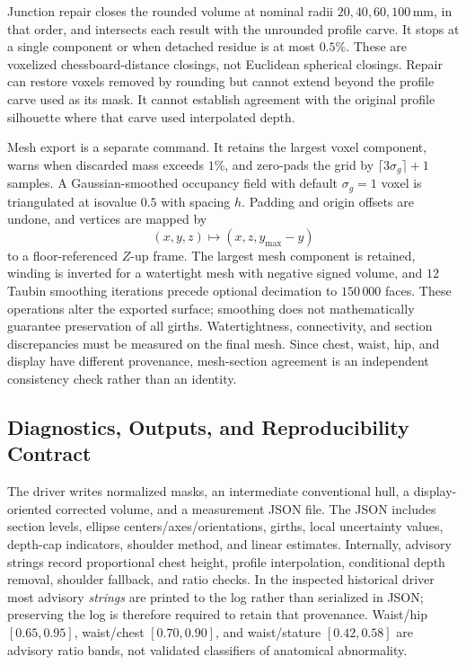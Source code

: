 Junction repair closes the rounded volume at nominal radii $20,40,60,100$\,mm, in that order, and intersects each result with the unrounded profile carve. It stops at a single component or when detached residue is at most $0.5\%$. These are voxelized chessboard-distance closings, not Euclidean spherical closings. Repair can restore voxels removed by rounding but cannot extend beyond the profile carve used as its mask. It cannot establish agreement with the original profile silhouette where that carve used interpolated depth.

Mesh export is a separate command. It retains the largest voxel component, warns when discarded mass exceeds $1\%$, and zero-pads the grid by $\lceil3\sigma_g\rceil+1$ samples. A Gaussian-smoothed occupancy field with default $\sigma_g=1$ voxel is triangulated at isovalue $0.5$ with spacing $h$. Padding and origin offsets are undone, and vertices are mapped by
\begin{equation}
(x,y,z)\mapsto(x,z,y_{\max}-y)
\end{equation}
to a floor-referenced $Z$-up frame. The largest mesh component is retained, winding is inverted for a watertight mesh with negative signed volume, and $12$ Taubin smoothing iterations precede optional decimation to $150\,000$ faces. These operations alter the exported surface; smoothing does not mathematically guarantee preservation of all girths. Watertightness, connectivity, and section discrepancies must be measured on the final mesh. Since chest, waist, hip, and display have different provenance, mesh-section agreement is an independent consistency check rather than an identity.

\subsection{Diagnostics, Outputs, and Reproducibility Contract}
\label{subsec:reliability_flags}
The driver writes normalized masks, an intermediate conventional hull, a display-oriented corrected volume, and a measurement JSON file. The JSON includes section levels, ellipse centers/axes/orientations, girths, local uncertainty values, depth-cap indicators, shoulder method, and linear estimates. Internally, advisory strings record proportional chest height, profile interpolation, conditional depth removal, shoulder fallback, and ratio checks. In the inspected historical driver most advisory \emph{strings} are printed to the log rather than serialized in JSON; preserving the log is therefore required to retain that provenance. Waist/hip $[0.65,0.95]$, waist/chest $[0.70,0.90]$, and waist/stature $[0.42,0.58]$ are advisory ratio bands, not validated classifiers of anatomical abnormality.

